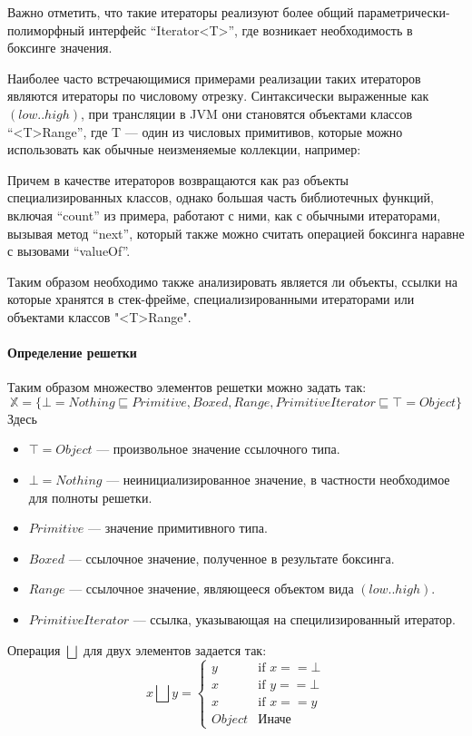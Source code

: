 Важно отметить, что такие итераторы реализуют более общий параметрически-полиморфный интерфейс
``Iterator<T>'', где возникает необходимость в боксинге значения.

Наиболее часто встречающимися примерами реализации таких итераторов являются итераторы
по числовому отрезку. Синтаксически выраженные как $(low..high)$, при трансляции в JVM они
становятся объектами классов ``<T>Range'', где T --- один из числовых примитивов, которые можно
использовать как обычные неизменяемые коллекции, например:

Причем в качестве итераторов возвращаются как раз объекты специализированных классов, однако
большая часть библиотечных функций, включая ``count'' из примера, работают с ними, как с обычными
итераторами, вызывая метод ``next'', который также можно считать операцией боксинга наравне
с вызовами ``valueOf''.

Таким образом необходимо также анализировать является ли объекты, ссылки на которые хранятся
в стек-фрейме, специализированными итераторами или объектами классов "<T>Range".

\paragraph{Определение решетки}
Таким образом множество элементов решетки можно задать так:
$$\mathbb{X} = \{\bot = Nothing \sqsubseteq  Primitive, Boxed, Range, PrimitiveIterator \sqsubseteq \top = Object \}$$
Здесь
\begin{itemize}
    \item $\top = Object$ --- произвольное значение ссылочного типа.
    \item $\bot = Nothing$ --- неинициализированное значение, в частности необходимое для полноты
    решетки.
    \item $Primitive$ --- значение примитивного типа.
    \item $Boxed$ --- ссылочное значение, полученное в результате боксинга.
    \item $Range$ --- ссылочное значение, являющееся объектом вида $(low..high)$.
    \item $PrimitiveIterator$ --- ссылка, указывающая на специлизированный итератор.
\end{itemize}

Операция $\bigsqcup$ для двух элементов задается так:
$$x \bigsqcup y =
\begin{cases}
y & \text{if } x == \bot \\
x & \text{if } y == \bot \\
x & \text{if } x == y \\
Object & \textit{Иначе}
\end{cases}
$$

